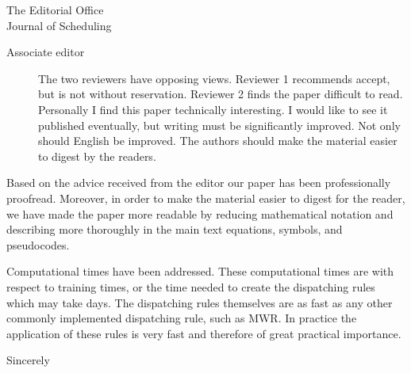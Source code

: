 \documentclass[]{letter}
\begin{document}
\begin{letter}{The Editorial Office \\ Journal of Scheduling}
\begin{description}
    \item[Associate editor] The two reviewers have opposing views.
    Reviewer 1 recommends accept, but is not without reservation.
    Reviewer 2 finds the paper difficult to read.
    Personally I find this paper technically interesting. I would like to see 
    it published eventually, but writing must be significantly improved. Not 
    only should English be improved. The authors should make the material 
    easier to digest by the readers.   
    
\end{description}
Based on the advice received from the editor our paper has been professionally 
proofread. 
Moreover, in order to make the material easier to digest for the reader, 
we have made the paper more readable by reducing mathematical notation and 
describing more thoroughly in the main text equations, symbols, and pseudocodes.

Computational times have been addressed. These computational times are with 
respect to training times, or the time needed to create the dispatching rules 
which may take days. The dispatching rules themselves are as fast as any other 
commonly implemented dispatching rule, such as MWR. In practice the 
application of these rules is very fast and therefore of great practical 
importance.


\signature{Helga Ingimundardottir}

\closing{Sincerely}


\end{letter}
\end{document}
